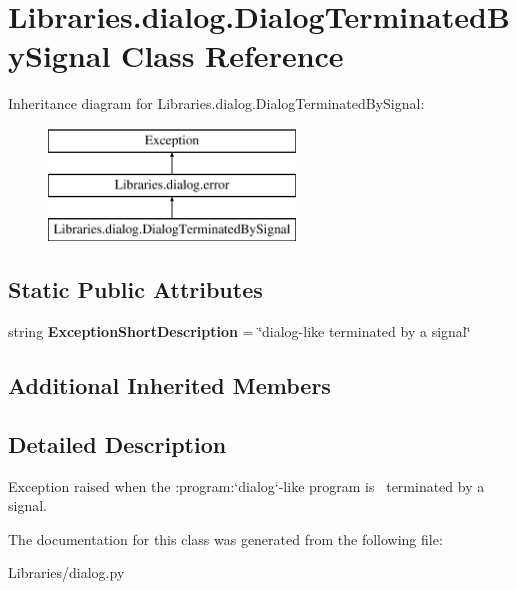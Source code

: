 \hypertarget{class_libraries_1_1dialog_1_1_dialog_terminated_by_signal}{}\section{Libraries.\+dialog.\+Dialog\+Terminated\+By\+Signal Class Reference}
\label{class_libraries_1_1dialog_1_1_dialog_terminated_by_signal}
Inheritance diagram for Libraries.\+dialog.\+Dialog\+Terminated\+By\+Signal\+:\begin{figure}[H]
\begin{center}
\leavevmode
\includegraphics[height=3.000000cm]{class_libraries_1_1dialog_1_1_dialog_terminated_by_signal}
\end{center}
\end{figure}
\subsection*{Static Public Attributes}
\begin{DoxyCompactItemize}
\item 
string {\bfseries Exception\+Short\+Description} = \char`\"{}dialog-\/like terminated by a signal\char`\"{}\hypertarget{class_libraries_1_1dialog_1_1_dialog_terminated_by_signal_a90f5fced46bf398884336f52aaac20c9}{}\label{class_libraries_1_1dialog_1_1_dialog_terminated_by_signal_a90f5fced46bf398884336f52aaac20c9}

\end{DoxyCompactItemize}
\subsection*{Additional Inherited Members}


\subsection{Detailed Description}
\begin{DoxyVerb}Exception raised when the :program:`dialog`-like program is \
terminated by a signal.\end{DoxyVerb}
 

The documentation for this class was generated from the following file\+:\begin{DoxyCompactItemize}
\item 
Libraries/dialog.\+py\end{DoxyCompactItemize}

